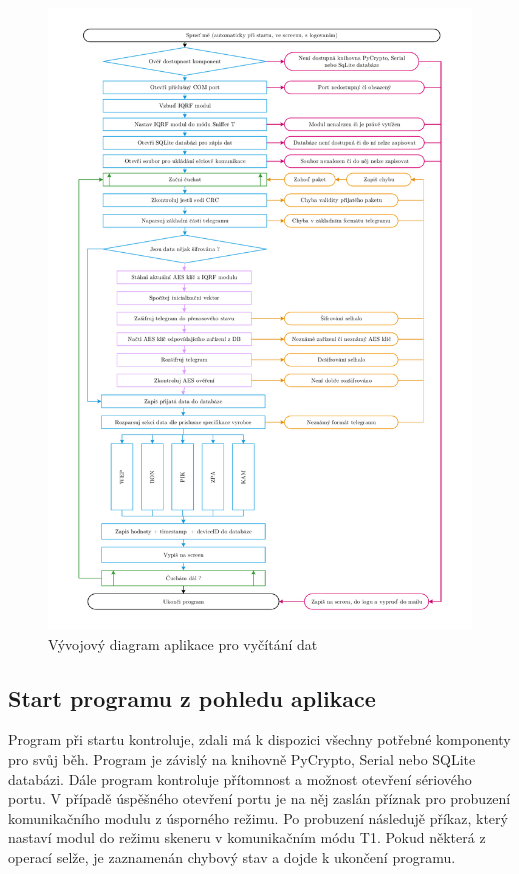  \begin{figure}[!ht]
	\vspace{-30pt}
  \begin{center}
    \includegraphics[scale=0.6]{obrazky/aplikace_diagram}
  \end{center}
	\vspace{-20pt}
  \caption{Vývojový diagram aplikace pro vyčítání dat}
	\label{AplikaceDiagram}
\end{figure}

\subsection{Start programu z pohledu aplikace}
Program při startu kontroluje, zdali  má k dispozici všechny potřebné komponenty pro svůj běh. Program je závislý na knihovně PyCrypto, Serial nebo SQLite databázi.
Dále program kontroluje přítomnost a možnost otevření sériového portu. V případě úspěšného otevření portu je na něj zaslán příznak pro probuzení komunikačního modulu z úsporného režimu. Po probuzení následujě příkaz, který nastaví modul do režimu skeneru v komunikačním módu T1. Pokud některá z operací selže, je zaznamenán chybový stav a dojde k ukončení programu.

